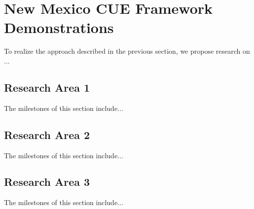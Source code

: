 \section{New Mexico CUE Framework Demonstrations}
\label{sec:demonstrations}

To realize the approach described in the previous section, we propose
research on ...

\subsection{Research Area 1}
\label{sec:research:1}
The milestones of this section include...

\subsection{Research Area 2}
\label{sec:research:2}

The milestones of this section include...
\subsection{Research Area 3}
\label{sec:research:3}

The milestones of this section include...
